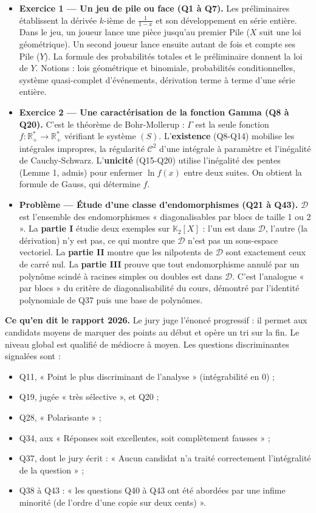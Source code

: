 \documentclass[11pt,a4paper]{article}
\providecommand{\tightlist}{\setlength{\itemsep}{0pt}\setlength{\parskip}{0pt}}
\begin{document}
\begin{itemize}
\tightlist
\item
  \textbf{Exercice 1 --- Un jeu de pile ou face (Q1 à Q7).} Les préliminaires établissent la dérivée \(k\)-ième de \(\frac1{1-x}\) et son développement en série entière. Dans le jeu, un joueur lance une pièce jusqu'au premier Pile (\(X\) suit une loi géométrique). Un second joueur lance ensuite autant de fois et compte ses Pile (\(Y\)). La formule des probabilités totales et le préliminaire donnent la loi de \(Y\). Notions : lois géométrique et binomiale, probabilités conditionnelles, système quasi-complet d'événements, dérivation terme à terme d'une série entière.
\item
  \textbf{Exercice 2 --- Une caractérisation de la fonction Gamma (Q8 à Q20).} C'est le théorème de Bohr-Mollerup : \(\Gamma\) est la seule fonction \(f:\mathbb R_+^*\to\mathbb R_+^*\) vérifiant le système \((S)\). L'\textbf{existence} (Q8-Q14) mobilise les intégrales impropres, la régularité \(\mathcal C^2\) d'une intégrale à paramètre et l'inégalité de Cauchy-Schwarz. L'\textbf{unicité} (Q15-Q20) utilise l'inégalité des pentes (Lemme 1, admis) pour enfermer \(\ln f(x)\) entre deux suites. On obtient la formule de Gauss, qui détermine \(f\).
\item
  \textbf{Problème --- Étude d'une classe d'endomorphismes (Q21 à Q43).} \(\mathcal D\) est l'ensemble des endomorphismes « diagonalisables par blocs de taille 1 ou 2 ». La \textbf{partie I} étudie deux exemples sur \(\mathbb K_2[X]\) : l'un est dans \(\mathcal D\), l'autre (la dérivation) n'y est pas, ce qui montre que \(\mathcal D\) n'est pas un sous-espace vectoriel. La \textbf{partie II} montre que les nilpotents de \(\mathcal D\) sont exactement ceux de carré nul. La \textbf{partie III} prouve que tout endomorphisme annulé par un polynôme scindé à racines simples ou doubles est dans \(\mathcal D\). C'est l'analogue « par blocs » du critère de diagonalisabilité du cours, démontré par l'identité polynomiale de Q37 puis une base de polynômes.
\end{itemize}

\textbf{Ce qu'en dit le rapport 2026.} Le jury juge l'énoncé progressif : il permet aux candidats moyens de marquer des points au début et opère un tri sur la fin. Le niveau global est qualifié de médiocre à moyen. Les questions discriminantes signalées sont :

\begin{itemize}
\tightlist
\item
  Q11, « Point le plus discriminant de l'analyse » (intégrabilité en \(0\)) ;
\item
  Q19, jugée « très sélective », et Q20 ;
\item
  Q28, « Polarisante » ;
\item
  Q34, aux « Réponses soit excellentes, soit complètement fausses » ;
\item
  Q37, dont le jury écrit : « Aucun candidat n'a traité correctement l'intégralité de la question » ;
\item
  Q38 à Q43 : « les questions Q40 à Q43 ont été abordées par une infime minorité (de l'ordre d'une copie sur deux cents) ».
\end{itemize}
\end{document}
